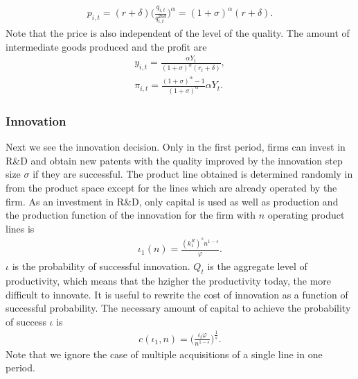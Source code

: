 \documentclass[a4paper,12pt]{article}
\begin{document}
\begin{align}
    p_{i,t} = (r+\delta)\Big(\frac{q_{i,t}}{q_{i,t}^{2nd}}\Big)^\alpha = (1+\sigma)^\alpha(r+\delta).
\end{align}
Note that the price is also independent of the level of the quality. The amount of intermediate goods produced and the profit are
\begin{align}
    y_{i,t} = \frac{\alpha Y_t}{(1+\sigma)^\alpha(r_t+\delta)},\\
    \pi_{i,t} = \frac{(1+\sigma)^\alpha-1}{(1+\sigma)^\alpha}\alpha Y_t .
\end{align}

\subsubsection{Innovation}
Next we see the innovation decision. Only in the first period, firms can invest in R\&D and obtain new patents with the quality improved by the innovation step size $\sigma$ if they are successful. The product line obtained is determined randomly in from the product space except for the lines which are already operated by the firm. As an investment in R\&D, only capital is used as well as production and the production function of the innovation for the firm with $n$ operating product lines is
\begin{align}
    \iota_1(n) = \frac{(k_1^R)^sn^{1-s}}{\varphi}.
\end{align}
$\iota$ is the probability of successful innovation. $Q_t$ is the aggregate level of productivity, which means that the hzigher the productivity today, the more difficult to innovate. It is useful to rewrite the cost of innovation as a function of successful probability. The necessary amount of capital to achieve the probability of success $\iota$ is
\begin{align}
    c(\iota_1, n) = \Big(\frac{\iota_t\varphi}{n^{1-s}}\Big)^\frac{1}{s}.
\end{align}
Note that we ignore the case of multiple acquisitions of a single line in one period. \par
\end{document}
